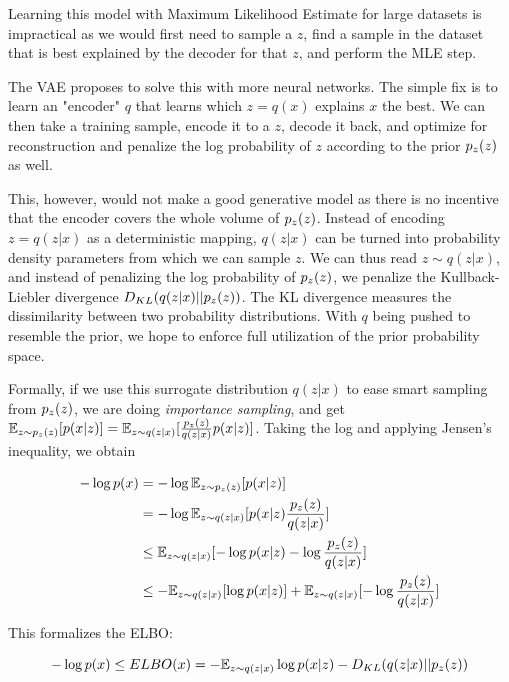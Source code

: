 Learning this model with Maximum Likelihood Estimate for large datasets is impractical as we would first need to sample a $z$, find a sample in the dataset that is best explained by the decoder for that $z$, and perform the MLE step.

The VAE \citep{vae} proposes to solve this with more neural networks. The simple fix is to learn an "encoder" $q$ that learns which $z = q(x)$ explains $x$ the best. We can then take a training sample, encode it to a $z$, decode it back, and optimize for reconstruction and penalize the log probability of $z$ according to the prior $p_z(z)$ as well.

This, however, would not make a good generative model as there is no incentive that the encoder covers the whole volume of $p_z(z)$. Instead of encoding $z = q(z|x)$ as a deterministic mapping, $q(z|x)$ can be turned into probability density parameters from which we can sample $z$. We can thus read $z \sim q(z|x)$, and instead of penalizing the log probability of $p_z(z)$, we penalize the Kullback-Liebler divergence $D_{KL}(q(z|x) || p_z(z))$. The KL divergence measures the dissimilarity between two probability distributions. With $q$ being pushed to resemble the prior, we hope to enforce full utilization of the prior probability space.

Formally, if we use this surrogate distribution $q(z|x)$ to ease smart sampling from $p_z(z)$, we are doing \emph{importance sampling}, and get $\mathbb{E}_{z \sim p_z(z)} [p(x|z)] = \mathbb{E}_{z \sim q(z|x)}[\frac{p_z(z)}{q(z|x)}p(x|z)]$. Taking the log and applying Jensen's inequality, we obtain

\begin{equation}
\begin{split}
    - \log p(x) & = - \log \mathbb{E}_{z \sim p_z(z)} [p(x | z) ] \\
    & = - \log \mathbb{E}_{z \sim q(z|x)} [ p(x | z) \frac{p_z(z)}{q(z|x)} ] \\
    & \leq \mathbb{E}_{z \sim q(z|x)} [- \log p(x | z)  - \log \frac{p_z(z)}{q(z|x)}] \\
    & \leq -\mathbb{E}_{z \sim q(z|x)}[\log p(x | z)] + \mathbb{E}_{z \sim q(z|x)} [- \log \frac{p_z(z)}{q(z|x)}] \\
\end{split}
\end{equation}

This formalizes the \ac{ELBO}:

\begin{equation}
    - \log p(x) \leq ELBO(x) = - \mathbb{E}_{z \sim q(z | x)} \log p(x | z) - D_{KL}(q(z | x) || p_z(z))
\end{equation}


